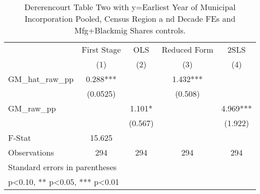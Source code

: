 \begin{table}[htbp]\centering
\def\sym#1{\ifmmode^{#1}\else\(^{#1}\)\fi}
\caption{Dererencourt Table Two with y=Earliest Year of Municipal Incorporation  Pooled, Census Region a nd Decade FEs and Mfg+Blackmig Shares controls.}
\begin{tabular}{l*{4}{c}}
\toprule
                    & First Stage   &         OLS   &Reduced Form   &        2SLS   \\
                    &\multicolumn{1}{c}{(1)}   &\multicolumn{1}{c}{(2)}   &\multicolumn{1}{c}{(3)}   &\multicolumn{1}{c}{(4)}   \\
\midrule
GM\_hat\_raw\_pp       &       0.288***&               &       1.432***&               \\
                    &    (0.0525)   &               &     (0.508)   &               \\
\addlinespace
GM\_raw\_pp           &               &       1.101*  &               &       4.969***\\
                    &               &     (0.567)   &               &     (1.922)   \\
\midrule
F-Stat              &      15.625   &               &               &               \\
Observations        &         294   &         294   &         294   &         294   \\
\bottomrule
\multicolumn{5}{l}{\footnotesize Standard errors in parentheses}\\
\multicolumn{5}{l}{\footnotesize * p<0.10, ** p<0.05, *** p<0.01}\\
\end{tabular}
\end{table}
